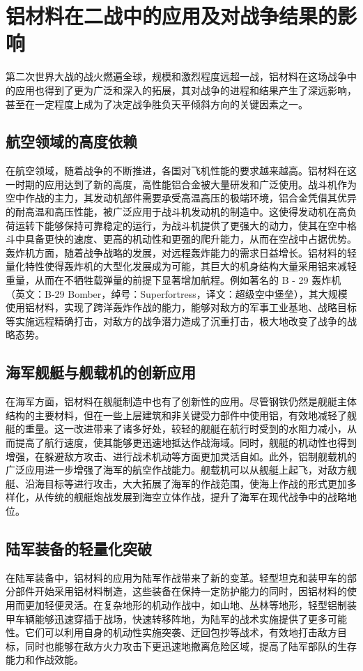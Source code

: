 \documentclass{source/Paper}
\begin{document}
\section{铝材料在二战中的应用及对战争结果的影响}
第二次世界大战的战火燃遍全球，规模和激烈程度远超一战，铝材料在这场战争中的应用也得到了更为广泛和深入的拓展，其对战争的进程和结果产生了深远影响，甚至在一定程度上成为了决定战争胜负天平倾斜方向的关键因素之一。
\subsection{航空领域的高度依赖}
在航空领域，随着战争的不断推进，各国对飞机性能的要求越来越高。铝材料在这一时期的应用达到了新的高度，高性能铝合金被大量研发和广泛使用。战斗机作为空中作战的主力，其发动机部件需要承受高温高压的极端环境，铝合金凭借其优异的耐高温和高压性能，被广泛应用于战斗机发动机的制造中。这使得发动机在高负荷运转下能够保持可靠稳定的运行，为战斗机提供了更强大的动力，使其在空中格斗中具备更快的速度、更高的机动性和更强的爬升能力，从而在空战中占据优势。轰炸机方面，随着战争战略的发展，对远程轰炸能力的需求日益增长。铝材料的轻量化特性使得轰炸机的大型化发展成为可能，其巨大的机身结构大量采用铝来减轻重量，从而在不牺牲载弹量的前提下显著增加航程。例如著名的 B - 29 轰炸机（英文：B-29 Bomber，绰号：Superfortress，译文：超级空中堡垒），其大规模使用铝材料，实现了跨洋轰炸作战的能力，能够对敌方的军事工业基地、战略目标等实施远程精确打击，对敌方的战争潜力造成了沉重打击，极大地改变了战争的战略态势。
\subsection{海军舰艇与舰载机的创新应用}
在海军方面，铝材料在舰艇制造中也有了创新性的应用。尽管钢铁仍然是舰艇主体结构的主要材料，但在一些上层建筑和非关键受力部件中使用铝，有效地减轻了舰艇的重量。这一改进带来了诸多好处，较轻的舰艇在航行时受到的水阻力减小，从而提高了航行速度，使其能够更迅速地抵达作战海域。同时，舰艇的机动性也得到增强，在躲避敌方攻击、进行战术机动等方面更加灵活自如。此外，铝制舰载机的广泛应用进一步增强了海军的航空作战能力。舰载机可以从舰艇上起飞，对敌方舰艇、沿海目标等进行攻击，大大拓展了海军的作战范围，使海上作战的形式更加多样化，从传统的舰艇炮战发展到海空立体作战，提升了海军在现代战争中的战略地位。
\subsection{陆军装备的轻量化突破}
在陆军装备中，铝材料的应用为陆军作战带来了新的变革。轻型坦克和装甲车的部分部件开始采用铝材料制造，这些装备在保持一定防护能力的同时，因铝材料的使用而更加轻便灵活。在复杂地形的机动作战中，如山地、丛林等地形，轻型铝制装甲车辆能够迅速穿插于战场，快速转移阵地，为陆军的战术实施提供了更多可能性。它们可以利用自身的机动性实施突袭、迂回包抄等战术，有效地打击敌方目标，同时也能够在敌方火力攻击下更迅速地撤离危险区域，提高了陆军部队的生存能力和作战效能。
\end{document}
